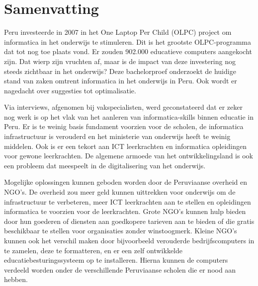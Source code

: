 %
%

%

\chapter*{Samenvatting}
\label{ch:samenvatting}
Peru investeerde in 2007 in het One Laptop Per Child (OLPC) project om informatica in het onderwijs te stimuleren. Dit is het grootste OLPC-programma dat tot nog toe plaats vond. Er zouden 902.000 educatieve computers aangekocht zijn. Dat wierp zijn vruchten af, maar is de impact van deze investering nog steeds zichtbaar in het onderwijs? Deze bachelorproef onderzoekt de huidige stand van zaken omtrent informatica in het onderwijs in Peru. Ook wordt er nagedacht over suggesties tot optimalisatie. 

Via interviews, afgenomen bij vakspecialisten, werd geconstateerd dat er zeker nog werk is op het vlak van het aanleren van informatica-skills binnen educatie in Peru. Er is te weinig basis fundament voorzien voor de scholen, de informatica infrastructuur is verouderd en het ministerie van onderwijs heeft te weinig middelen. Ook is er een tekort aan ICT leerkrachten en informatica opleidingen voor gewone leerkrachten. De algemene armoede van het ontwikkelingsland is ook een probleem dat meespeelt in de digitalisering van het onderwijs. 

Mogelijke oplossingen kunnen geboden worden door de Peruviaanse overheid en NGO's. De overheid zou meer geld kunnen uittrekken voor onderwijs om de infrastructuur te verbeteren, meer ICT leerkrachten aan te stellen en opleidingen informatica te voorzien voor de leerkrachten. Grote NGO's kunnen hulp bieden door hun goederen of diensten aan goedkopere tarieven aan te bieden of die gratis beschikbaar te stellen voor organisaties zonder winstoogmerk. Kleine NGO's kunnen ook het verschil maken door bijvoorbeeld verouderde bedrijfscomputers in te zamelen, deze te formatteren, en er een zelf ontwikkelde educatiebesturingssysteem op te installeren. Hierna kunnen de computers verdeeld worden onder de verschillende Peruviaanse scholen die er nood aan hebben. 

